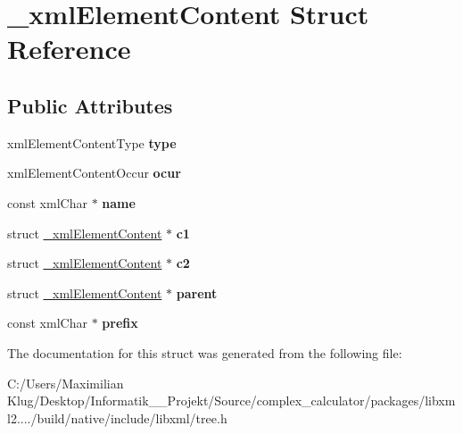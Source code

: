 \hypertarget{struct__xml_element_content}{}\section{\+\_\+xml\+Element\+Content Struct Reference}
\label{struct__xml_element_content}
\subsection*{Public Attributes}
\begin{DoxyCompactItemize}
\item 
\mbox{\label{struct__xml_element_content_a9ec31227deddf6cb534eaba958cc8a2a}} 
xml\+Element\+Content\+Type {\bfseries type}
\item 
\mbox{\label{struct__xml_element_content_a45c3092e58963270a4c9640016b61ce3}} 
xml\+Element\+Content\+Occur {\bfseries ocur}
\item 
\mbox{\label{struct__xml_element_content_ad383369c8a49f1cb3999439c62c9f98f}} 
const xml\+Char $\ast$ {\bfseries name}
\item 
\mbox{\label{struct__xml_element_content_af125e186de93fc51a627314d7d19fd83}} 
struct \mbox{\hyperlink{struct__xml_element_content}{\+\_\+xml\+Element\+Content}} $\ast$ {\bfseries c1}
\item 
\mbox{\label{struct__xml_element_content_a198db6da2997f0b080b90cd5e810abc7}} 
struct \mbox{\hyperlink{struct__xml_element_content}{\+\_\+xml\+Element\+Content}} $\ast$ {\bfseries c2}
\item 
\mbox{\label{struct__xml_element_content_af3f9d19c234e96d250039a2c614fe135}} 
struct \mbox{\hyperlink{struct__xml_element_content}{\+\_\+xml\+Element\+Content}} $\ast$ {\bfseries parent}
\item 
\mbox{\label{struct__xml_element_content_acd325785e618ba78d92a889e134bc287}} 
const xml\+Char $\ast$ {\bfseries prefix}
\end{DoxyCompactItemize}


The documentation for this struct was generated from the following file\+:\begin{DoxyCompactItemize}
\item 
C\+:/\+Users/\+Maximilian Klug/\+Desktop/\+Informatik\+\_\+\_\+\+Projekt/\+Source/complex\+\_\+calculator/packages/libxml2..../build/native/include/libxml/tree.\+h\end{DoxyCompactItemize}
